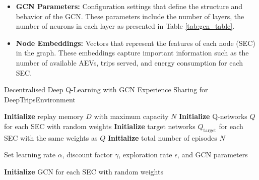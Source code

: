 \begin{itemize}
    \item \textbf{GCN Parameters:} Configuration settings that define the structure and behavior of the GCN. These parameters include the number of layers, the number of neurons in each layer as presented in Table \ref{tab:gcn_table}.

    \item \textbf{Node Embeddings:} Vectors that represent the features of each node (SEC) in the graph. These embeddings capture important information such as the number of available AEVs, trips served, and energy consumption for each SEC.
\end{itemize}
\begin{algorithm}[ht]
\caption{Decentralised Deep Q-Learning with GCN Experience Sharing for DeepTripsEnvironment}
\small %
\SetAlgoLined



\textbf{Initialize} replay memory $D$ with maximum capacity $N$\;
\textbf{Initialize} Q-networks $Q$ for each SEC with random weights\;
\textbf{Initialize} target networks $Q_{\text{target}}$ for each SEC with the same weights as $Q$\;
\textbf{Initialize} total number of episodes $N$\;

Set learning rate $\alpha$, discount factor $\gamma$, exploration rate $\epsilon$, and GCN parameters\;

\textbf{Initialize} GCN for each SEC with random weights\;

\end{algorithm}
